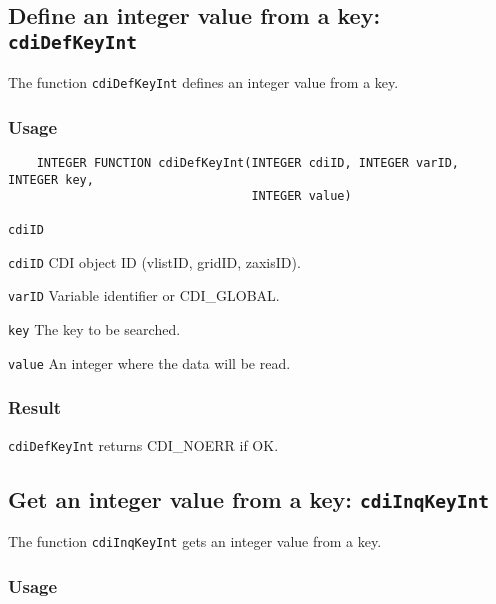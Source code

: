 \subsection{Define an integer value from a key: \texttt{cdiDefKeyInt}}
\label{cdiDefKeyInt}

The function {\texttt{cdiDefKeyInt}} defines an integer value from a key.

\subsubsection*{Usage}

\begin{verbatim}
    INTEGER FUNCTION cdiDefKeyInt(INTEGER cdiID, INTEGER varID, INTEGER key, 
                                  INTEGER value)
\end{verbatim}

\hspace*{4mm}\begin{minipage}[]{15cm}
\begin{deflist}{\texttt{cdiID}\ }
\item[\texttt{cdiID}]
CDI object ID (vlistID, gridID, zaxisID).
\item[\texttt{varID}]
Variable identifier or CDI\_GLOBAL.
\item[\texttt{key}]
The key to be searched.
\item[\texttt{value}]
An integer where the data will be read.

\end{deflist}
\end{minipage}

\subsubsection*{Result}

{\texttt{cdiDefKeyInt}} returns CDI\_NOERR if OK.



\subsection{Get an integer value from a key: \texttt{cdiInqKeyInt}}
\label{cdiInqKeyInt}

The function {\texttt{cdiInqKeyInt}} gets an integer value from a key.

\subsubsection*{Usage}

